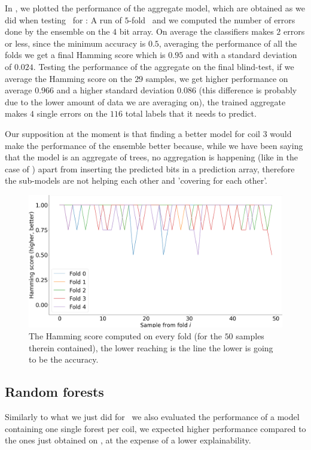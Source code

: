 In , we plotted the performance of the aggregate model, which are obtained as we
did when testing \tas\ for \qrp: A run of $5$-fold \cv\ and we computed the number of errors done by
the ensemble on the $4$ bit array. On average the classifiers makes $2$ errors or less, since the
minimum accuracy is $0.5$, averaging the performance of all the folds we get a final Hamming score
which is $0.95$ and with a standard deviation of $0.024$. Testing the performance of the aggregate
on the final blind-test, if we average the Hamming score on the $29$ samples, we get higher
performance on average $0.966$ and a higher standard deviation $0.086$ (this difference is probably
due to the lower amount of data we are averaging on), the trained aggregate makes $4$ single errors
on the $116$ total labels that it needs to predict.

Our supposition at the moment is that finding a better model for coil $3$ would make the performance of
the ensemble better because, while we have been saying that the model is an aggregate of trees, no
aggregation is happening (like in the case of \tas) apart from inserting the predicted bits in a
prediction array, therefore the sub-models are not helping each other and 'covering for each other'.

\begin{figure}[!ht]
	\centering
	\includegraphics[width=\linewidth]{img/best_dts_hs.png}
	\caption{The Hamming score computed on every fold (for the $50$ samples therein contained), the lower reaching is the line the lower is going to be the accuracy.} \label{fig:dt-qlp-hs}
\end{figure}

\subsection{Random forests}
Similarly to what we just did for \dts\ we also evaluated the performance of a model containing one
single forest per coil, we expected higher performance compared to the ones just obtained on \dts,
at the expense of a lower explainability.


